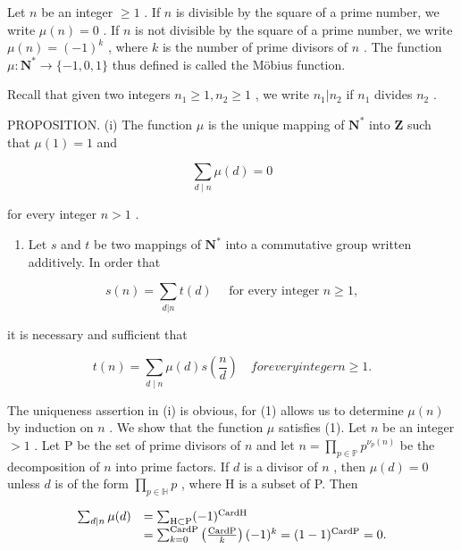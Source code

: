 
Let \(n\) be an integer \(\geqslant 1\) . If \(n\) is divisible by the square of a prime number, we write \(\mu(n) = 0\) . If \(n\) is not divisible by the square of a prime number, we write \(\mu(n) = (-1)^k\) , where \(k\) is the number of prime divisors of \(n\) . The function \(\mu: \mathbf{N}^* \to \{-1, 0, 1\}\) thus defined is called the Möbius function.

Recall that given two integers \(n_1 \geqslant 1, n_2 \geqslant 1\) , we write \(n_1|n_2\) if \(n_1\) divides \(n_2\) .

PROPOSITION. (i) The function \(\mu\) is the unique mapping of \(\mathbf{N}^*\) into \(\mathbf{Z}\) such that \(\mu(1) = 1\) and

\[
\sum_ {d \mid n} \mu (d) = 0\tag{1}
\]

for every integer \(n > 1\) .

\begin{enumerate}
\def\labelenumi{(\roman{enumi})}
\setcounter{enumi}{1}
\tightlist
\item
  Let \(s\) and \(t\) be two mappings of \(\mathbf{N}^*\) into a commutative group written additively. In order that
\end{enumerate}

\[
s (n) = \sum_ {d | n} t (d) \quad \text { for   every   integer } n \geqslant 1,\tag{2}
\]

it is necessary and sufficient that

\[
t (n) = \sum_ {d \mid n} \mu (d) s \left(\frac {n}{d}\right) \quad for every integer n \geqslant 1.\tag{3}
\]

The uniqueness assertion in (i) is obvious, for (1) allows us to determine \(\mu(n)\) by induction on \(n\) . We show that the function \(\mu\) satisfies (1). Let \(n\) be an integer \(>1\) . Let P be the set of prime divisors of \(n\) and let \(n = \prod_{p \in \mathbb{P}} p^{\nu_p(n)}\) be the decomposition of \(n\) into prime factors. If \(d\) is a divisor of \(n\) , then \(\mu(d) = 0\) unless \(d\) is of the form \(\prod_{p \in \mathbb{H}} p\) , where H is a subset of P. Then

\[
\begin{array}{r l} \sum_ {d | n} \mu (d) & = \sum_ {\mathrm{H} \subset \mathrm{P}} (- 1) ^ {\mathrm{CardH}} \\ & = \sum_ {k = 0} ^ {\mathrm{CardP}} \left(\frac {\mathrm{CardP}}{k}\right) (- 1) ^ {k} = (1 - 1) ^ {\mathrm{CardP}} = 0. \end{array}
\]


